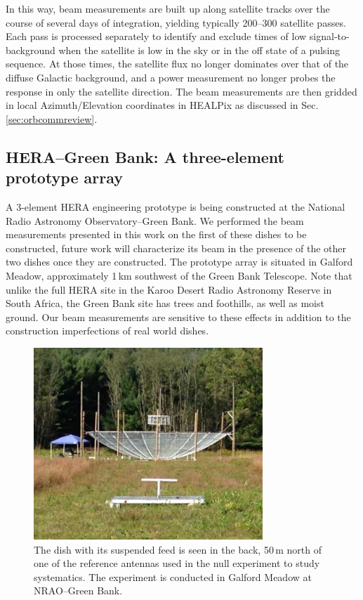 In this way, beam measurements are built up along satellite tracks over the course of 
several days of integration, yielding typically 200--300 satellite passes. Each pass is 
processed separately to identify and exclude times of low signal-to-background when the 
satellite is low in the sky or in the off state of a pulsing sequence. At those times, the 
satellite flux no longer dominates over that of the diffuse Galactic background, and a 
power measurement no longer probes the response in only the satellite direction. The beam 
measurements are then gridded in local Azimuth/Elevation coordinates in HEALPix \citep{healpix} as discussed in Sec. \ref{sec:orbcommreview}.


\subsection{HERA--Green Bank: A three-element prototype array}

A 3-element HERA engineering prototype is being constructed at the National Radio 
Astronomy Observatory--Green Bank. We performed the beam measurements presented in 
this work on the first of these dishes to be constructed, future work will characterize its beam in the presence of the other two dishes once they are constructed. The prototype array is situated in Galford Meadow, approximately 1\,km southwest of the Green Bank Telescope. Note that unlike the full HERA site in the Karoo Desert Radio Astronomy Reserve in 
South Africa, the Green Bank site has trees and foothills, as well as moist ground. Our beam measurements
are sensitive to these effects in addition to the construction imperfections of real world dishes.

\begin{figure}[h]
\centering
\includegraphics[width=3.4in]{chap3_hera_beammapping/ref_dipole_and_hera_dish.pdf}
\caption[The dish with its suspended feed is seen in the back of this image.]{The dish with its suspended feed is seen in the back, 50\,m north of one of the reference antennas used in the null experiment to study systematics. The experiment is conducted in Galford Meadow at NRAO--Green Bank.}
\label{fig:greenbankdishphoto}
\end{figure}


